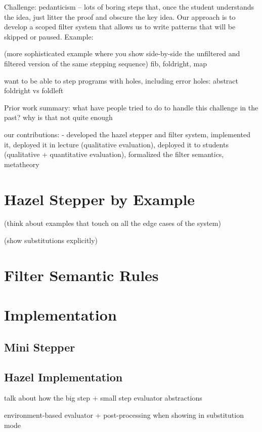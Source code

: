 
Challenge: pedanticism -- lots of boring steps that, once the student understands the idea, just litter the proof and obscure the key idea. Our approach is to develop a scoped filter system that allows us to write patterns that will be skipped or paused. Example:

(more sophisticated example where you show side-by-side the unfiltered and filtered version of the same stepping sequence)
fib, foldright, map

want to be able to step programs with holes, including error holes:
abstract foldright vs foldleft

Prior work summary: what have people tried to do to handle this challenge in the past? why is that not quite enough

our contributions:
- developed the hazel stepper and filter system, implemented it, deployed it in lecture (qualitative evaluation), deployed it to students (qualitative + quantitative evaluation), formalized the filter semantics, metatheory

\section{Hazel Stepper by Example}
(think about examples that touch on all the edge cases of the system) 

(show substitutions explicitly)

\section{Filter Semantic Rules}



\section{Implementation}

\subsection{Mini Stepper}

\subsection{Hazel Implementation}

talk about how the big step + small step evaluator abstractions

environment-based evaluator + post-processing when showing in substitution mode

